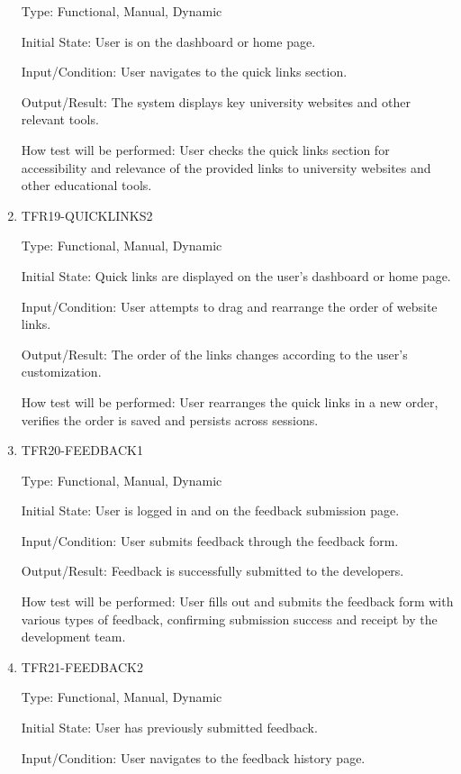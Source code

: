 \documentclass[12pt, titlepage]{article}
\begin{document}
\begin{enumerate}
Type: Functional, Manual, Dynamic

Initial State: User is on the dashboard or home page.

Input/Condition: User navigates to the quick links section.

Output/Result: The system displays key university websites and other relevant tools.

How test will be performed: User checks the quick links section for accessibility and relevance of the provided links to university websites and other educational tools.


\item{TFR19-QUICKLINKS2\\}\label{TFR19-QUICKLINKS2}

Type: Functional, Manual, Dynamic

Initial State: Quick links are displayed on the user's dashboard or home page.

Input/Condition: User attempts to drag and rearrange the order of website links.

Output/Result: The order of the links changes according to the user's customization.

How test will be performed: User rearranges the quick links in a new order, verifies the order is saved and persists across sessions.

\item{TFR20-FEEDBACK1\\}\label{TFR20-FEEDBACK1}

Type: Functional, Manual, Dynamic

Initial State: User is logged in and on the feedback submission page.

Input/Condition: User submits feedback through the feedback form.

Output/Result: Feedback is successfully submitted to the developers.

How test will be performed: User fills out and submits the feedback form with various types of feedback, confirming submission success and receipt by the development team.


\item{TFR21-FEEDBACK2\\}\label{TFR21-FEEDBACK2}

Type: Functional, Manual, Dynamic

Initial State: User has previously submitted feedback.

Input/Condition: User navigates to the feedback history page.


\end{enumerate}
\end{document}

